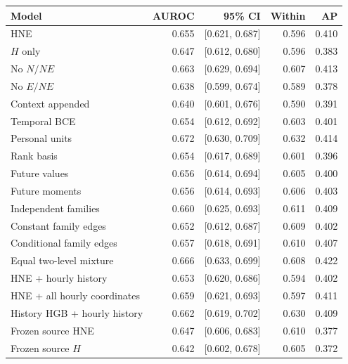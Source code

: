 \begin{tabular*}{\linewidth}{@{\extracolsep{\fill}}lrrrr@{}}
\toprule
Model & AUROC & 95\% CI & Within & AP \\
\midrule
HNE & 0.655 & [0.621, 0.687] & 0.596 & 0.410 \\
$H$ only & 0.647 & [0.612, 0.680] & 0.596 & 0.383 \\
No $N/NE$ & 0.663 & [0.629, 0.694] & 0.607 & 0.413 \\
No $E/NE$ & 0.638 & [0.599, 0.674] & 0.589 & 0.378 \\
Context appended & 0.640 & [0.601, 0.676] & 0.590 & 0.391 \\
Temporal BCE & 0.654 & [0.612, 0.692] & 0.603 & 0.401 \\
Personal units & 0.672 & [0.630, 0.709] & 0.632 & 0.414 \\
Rank basis & 0.654 & [0.617, 0.689] & 0.601 & 0.396 \\
Future values & 0.656 & [0.614, 0.694] & 0.605 & 0.400 \\
Future moments & 0.656 & [0.614, 0.693] & 0.606 & 0.403 \\
Independent families & 0.660 & [0.625, 0.693] & 0.611 & 0.409 \\
Constant family edges & 0.652 & [0.612, 0.687] & 0.609 & 0.402 \\
Conditional family edges & 0.657 & [0.618, 0.691] & 0.610 & 0.407 \\
Equal two-level mixture & 0.666 & [0.633, 0.699] & 0.608 & 0.422 \\
HNE + hourly history & 0.653 & [0.620, 0.686] & 0.594 & 0.402 \\
HNE + all hourly coordinates & 0.659 & [0.621, 0.693] & 0.597 & 0.411 \\
History HGB + hourly history & 0.662 & [0.619, 0.702] & 0.630 & 0.409 \\
Frozen source HNE & 0.647 & [0.606, 0.683] & 0.610 & 0.377 \\
Frozen source $H$ & 0.642 & [0.602, 0.678] & 0.605 & 0.372 \\
\bottomrule
\end{tabular*}
